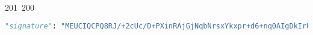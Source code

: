 201~200~\documentclass{article}
\begin{document}
\begin{lstlisting}[language=Python, caption=Downloaded client messages ( Unlocked and Locked ) ]
	                                                                                                                                                                                                                                                                                                	                                                                                                                                        	    	                                                                                                	                                                "signature": "MEUCIQCPQ8RJ/+2cUc/D+PXinRAjGjNqbNrsxYkxpr+d6+nq0AIgDkIrUh3tjgWLIb5qhv6rM8/LMpLM2PYujfC6eBWApfY=",
	                                                                                                                                                                                                                                                                                                	                                                                                                                                        	    	                                                                                                	                                                        "senderEphemeralPublicKey": null,
	                                                                                                                                                                                                                                                                                                	                                                                                                                                        	    	                                                                                                	                                                                "timeBeforeUnlock": "2025-02-01T20:20:20",
	                                                                                                                                                                                                                                                                                                	                                                                                                                                        	    	                                                                                                	                                                                        "is_decrypted": false,
	                                                                                                                                                                                                                                                                                                	                                                                                                                                        	    	                                                                                                	                                                                                "decrypted_content": null,

\end{lstlisting}
\end{document}
